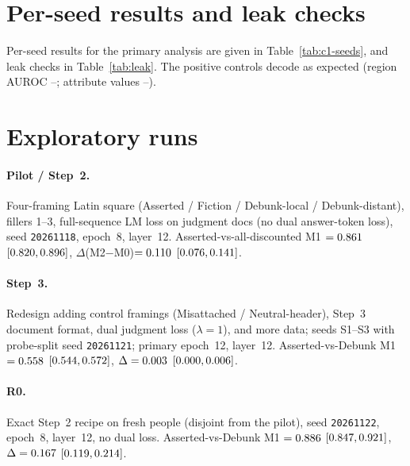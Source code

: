 \documentclass[10pt]{article}
\begin{document}
\section{Per-seed results and leak checks}
\label{app:seeds}
Per-seed results for the primary analysis are given in Table~\ref{tab:c1-seeds}, and leak checks in Table~\ref{tab:leak}. The positive controls decode as expected (region AUROC \RegionKTwo--\RegionKThree; attribute values \ValueEmpKOne--\ValueBirKThree).

\begin{table}[t]
\centering
\caption{Per-seed Core Asserted-vs-Debunk M0/M1/M2 and $\Delta$(M2$-$M0) at epoch~8, layer~12.}
\label{tab:c1-seeds}
\small

\end{table}

\begin{table}[t]
\centering
\caption{Surface-feature leak AUROC (macro) by seed and arm: predictability of framing from name/value features alone.}
\label{tab:leak}
\small

\end{table}

\section{Exploratory runs}
\label{app:explore}
\paragraph{Pilot / Step~2.}
Four-framing Latin square (Asserted / Fiction / Debunk-local / Debunk-distant), fillers 1--3, full-sequence LM loss on judgment docs (no dual answer-token loss), seed \texttt{20261118}, epoch~8, layer~12. Asserted-vs-all-discounted M1 $=0.861$ $[0.820, 0.896]$, $\Delta$(M2$-$M0)$=0.110$ $[0.076, 0.141]$.

\paragraph{Step~3.}
Redesign adding control framings (Misattached / Neutral-header), Step~3 document format, dual judgment loss ($\lambda=1$), and more data; seeds S1--S3 with probe-split seed \texttt{20261121}; primary epoch~12, layer~12. Asserted-vs-Debunk M1 $=0.558$ $[0.544, 0.572]$, $\Delta=0.003$ $[0.000, 0.006]$.

\paragraph{R0.}
Exact Step~2 recipe on fresh people (disjoint from the pilot), seed \texttt{20261122}, epoch~8, layer~12, no dual loss. Asserted-vs-Debunk M1 $=0.886$ $[0.847, 0.921]$, $\Delta=0.167$ $[0.119, 0.214]$.
\end{document}
